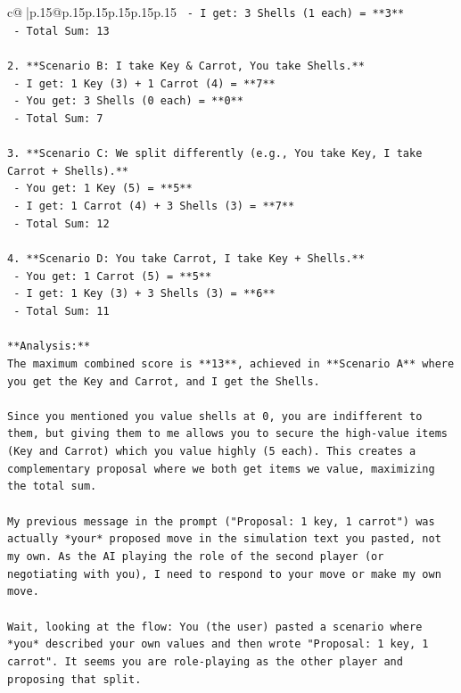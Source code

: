 \documentclass{article}
\begin{document}
{\begin{supertabular}{c@{$\;$}|p{.15\linewidth}@{}p{.15\linewidth}p{.15\linewidth}p{.15\linewidth}p{.15\linewidth}p{.15\linewidth}}
{{{\texttt{    {-}   I get: 3 Shells (1 each) = **3**} \\
\texttt{    {-}   Total Sum: 13} \\
\\ 
\texttt{2.  **Scenario B: I take Key \& Carrot, You take Shells.**} \\
\texttt{    {-}   I get: 1 Key (3) + 1 Carrot (4) = **7**} \\
\texttt{    {-}   You get: 3 Shells (0 each) = **0**} \\
\texttt{    {-}   Total Sum: 7} \\
\\ 
\texttt{3.  **Scenario C: We split differently (e.g., You take Key, I take Carrot + Shells).**} \\
\texttt{    {-}   You get: 1 Key (5) = **5**} \\
\texttt{    {-}   I get: 1 Carrot (4) + 3 Shells (3) = **7**} \\
\texttt{    {-}   Total Sum: 12} \\
\\ 
\texttt{4.  **Scenario D: You take Carrot, I take Key + Shells.**} \\
\texttt{    {-}   You get: 1 Carrot (5) = **5**} \\
\texttt{    {-}   I get: 1 Key (3) + 3 Shells (3) = **6**} \\
\texttt{    {-}   Total Sum: 11} \\
\\ 
\texttt{**Analysis:**} \\
\texttt{The maximum combined score is **13**, achieved in **Scenario A** where you get the Key and Carrot, and I get the Shells.} \\
\\ 
\texttt{Since you mentioned you value shells at 0, you are indifferent to them, but giving them to me allows you to secure the high{-}value items (Key and Carrot) which you value highly (5 each). This creates a complementary proposal where we both get items we value, maximizing the total sum.} \\
\\ 
\texttt{My previous message in the prompt ("Proposal: 1 key, 1 carrot") was actually *your* proposed move in the simulation text you pasted, not my own. As the AI playing the role of the second player (or negotiating with you), I need to respond to your move or make my own move.} \\
\\ 
\texttt{Wait, looking at the flow: You (the user) pasted a scenario where *you* described your own values and then wrote "Proposal: 1 key, 1 carrot". It seems you are role{-}playing as the other player and proposing that split.} \\
}}}
\end{supertabular}}
\end{document}
